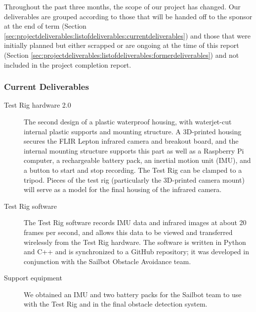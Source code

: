 
\iffalse
This is a direct follow-up from the details contained in the Project Proposal section. The list can describe the final state of each item in the list, any differences between the original deliverables and the actual deliverables, and in what form the Project Sponsor can expect to receive the Deliverable from the Team Members.
\fi

Throughout the past three months, the scope of our project has changed. Our deliverables are grouped according to those that will be handed off to the sponsor at the end of term (Section \ref{sec:projectdeliverables:listofdeliverables:currentdeliverables}) and those that were initially planned but either scrapped or are ongoing at the time of this report (Section \ref{sec:projectdeliverables:listofdeliverables:formerdeliverables}) and not included in the project completion report.

\subsubsection{\label{sec:projectdeliverables:listofdeliverables:currentdeliverables}Current Deliverables}

\begin{description}
\item[Test Rig hardware 2.0] The second design of a plastic waterproof housing, with waterjet-cut internal plastic supports and mounting structure. A 3D-printed housing secures the FLIR Lepton infrared camera and breakout board, and the internal mounting structure supports this part as well as a Raspberry Pi computer, a rechargeable battery pack, an inertial motion unit (IMU), and a button to start and stop recording. The Test Rig can be clamped to a tripod. Pieces of the test rig (particularly the 3D-printed camera mount) will serve as a model for the final housing of the infrared camera.
\item[Test Rig software] The Test Rig software records IMU data and infrared images at about 20 frames per second, and allows this data to be viewed and transferred wirelessly from the Test Rig hardware. The software is written in Python and C++ and is synchronized to a GitHub repository; it was developed in conjunction with the Sailbot Obstacle Avoidance team.
\item[Support equipment] We obtained an IMU and two battery packs for the Sailbot team to use with the Test Rig and in the final obstacle detection system.
\end{description}


